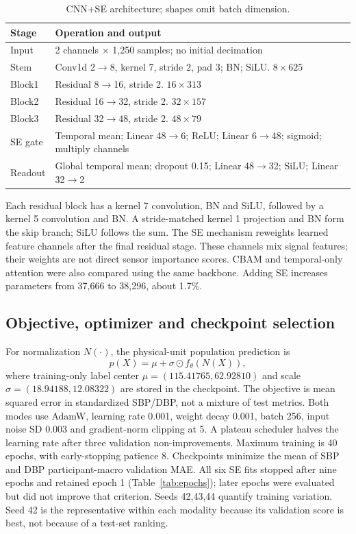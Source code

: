 \documentclass[conference]{IEEEtran}
\begin{document}
\begin{table}[t]\centering\small
\caption{CNN+SE architecture; shapes omit batch dimension.}
\label{tab:layers}
\begin{tabular}{lp{2.45in}}\toprule
Stage & Operation and output\\\midrule
Input & 2 channels $\times$ 1,250 samples; no initial decimation\\
Stem & Conv1d 2$\to$8, kernel 7, stride 2, pad 3; BN; SiLU. $8\times625$\\
Block1 & Residual 8$\to$16, stride 2. $16\times313$\\
Block2 & Residual 16$\to$32, stride 2. $32\times157$\\
Block3 & Residual 32$\to$48, stride 2. $48\times79$\\
SE gate & Temporal mean; Linear 48$\to$6; ReLU; Linear 6$\to$48; sigmoid; multiply channels\\
Readout & Global temporal mean; dropout 0.15; Linear 48$\to$32; SiLU; Linear 32$\to$2\\\bottomrule
\end{tabular}\end{table}

Each residual block has a kernel 7 convolution, BN and SiLU, followed by a
kernel 5 convolution and BN. A stride-matched kernel 1 projection and BN form
the skip branch; SiLU follows the sum. The SE mechanism \cite{hu2018se}
reweights learned feature channels after the final residual stage. These
channels mix signal features; their weights are not direct sensor importance
scores. CBAM and temporal-only attention were also compared using the same
backbone. Adding SE increases parameters from 37,666 to 38,296, about 1.7\%.

\subsection{Objective, optimizer and checkpoint selection}
For normalization $N(\cdot)$, the physical-unit population prediction is
\begin{equation}
 p(X)=\mu+\sigma\odot f_\theta(N(X)),
\end{equation}
where training-only label center $\mu=(115.41765,62.92810)$ and scale
$\sigma=(18.94188,12.08322)$ are stored in the checkpoint. The objective is
mean squared error in standardized SBP/DBP, not a mixture of test metrics.
Both modes use AdamW, learning rate 0.001, weight decay 0.001, batch 256, input
noise SD 0.003 and gradient-norm clipping at 5. A plateau scheduler halves the
learning rate after three validation non-improvements. Maximum training is 40
epochs, with early-stopping patience 8. Checkpoints minimize the mean of SBP
and DBP participant-macro validation MAE. All six SE fits stopped after nine
epochs and retained epoch 1 (Table~\ref{tab:epochs}); later epochs were evaluated
but did not improve that criterion. Seeds 42,43,44 quantify training variation.
Seed 42 is the representative within each modality because its validation score
is best, not because of a test-set ranking.
\end{document}
